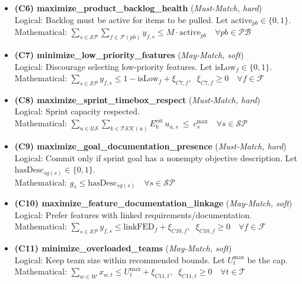 \documentclass[11pt,a4paper]{article}
\begin{document}
\begin{itemize}[leftmargin=2.2em]
  \item \textbf{(C6) maximize\_product\_backlog\_health} \;(\textit{Must-Match, hard}) \\
  Logical: Backlog must be active for items to be pulled. Let $\text{active}_{pb}\in\{0,1\}$. \\
  Mathematical: $\displaystyle \sum_{s\in\mathcal{SP}} \sum_{f\in\mathcal{F}(pb)} y_{f,s} \le M\cdot \text{active}_{pb}\quad \forall pb\in\mathcal{PB}$

  \item \textbf{(C7) minimize\_low\_priority\_features} \;(\textit{May-Match, soft}) \\
  Logical: Discourage selecting low-priority features. Let $\text{isLow}_f\in\{0,1\}$. \\
  Mathematical: $\displaystyle \sum_{s\in\mathcal{SP}} y_{f,s} \le 1-\text{isLow}_f + \xi_{C7,f},\;\; \xi_{C7,f}\ge 0\quad \forall f\in\mathcal{F}$

  \item \textbf{(C8) maximize\_sprint\_timebox\_respect} \;(\textit{Must-Match, hard}) \\
  Logical: Sprint capacity respected. \\
  Mathematical: $\displaystyle \sum_{u\in\mathcal{US}} \sum_{k\in\mathcal{TSK}(u)} E^{\text{est}}_{k}\, u_{u,s}\ \le\ c^{\max}_{s}\quad \forall s\in\mathcal{SP}$

  \item \textbf{(C9) maximize\_goal\_documentation\_presence} \;(\textit{Must-Match, hard}) \\
  Logical: Commit only if sprint goal has a nonempty objective description. Let $\text{hasDesc}_{sg(s)}\in\{0,1\}$. \\
  Mathematical: $\displaystyle g_s \le \text{hasDesc}_{sg(s)}\quad \forall s\in\mathcal{SP}$

  \item \textbf{(C10) maximize\_feature\_documentation\_linkage} \;(\textit{May-Match, soft}) \\
  Logical: Prefer features with linked requirements/documentation. \\
  Mathematical: $\displaystyle \sum_{s\in\mathcal{SP}} y_{f,s} \le \text{linkFED}_{f} + \xi_{C10,f},\;\; \xi_{C10,f}\ge 0\quad \forall f\in\mathcal{F}$

  \item \textbf{(C11) minimize\_overloaded\_teams} \;(\textit{May-Match, soft}) \\
  Logical: Keep team size within recommended bounds. Let $U^{\max}_t$ be the cap. \\
  Mathematical: $\displaystyle \sum_{w\in\mathcal{W}} x_{w,t} \le U^{\max}_t + \xi_{C11,t},\;\; \xi_{C11,t}\ge 0 \quad \forall t\in\mathcal{T}$

\end{itemize}
\end{document}
